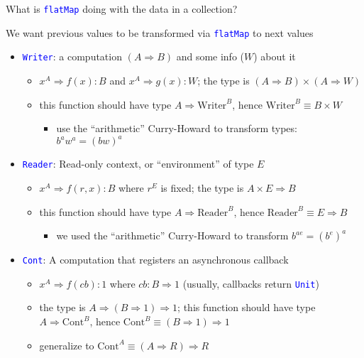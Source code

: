 \documentclass[english]{beamer}
\newenvironment{lyxcode}
   {\par\begin{list}{}{
     \setlength{\rightmargin}{\leftmargin}
     \setlength{\listparindent}{0pt}%
     \raggedright
     \setlength{\itemsep}{0pt}
     \setlength{\parsep}{0pt}
     \normalfont\ttfamily}%
    \def\{{\char`\{}
    \def\}{\char`\}}
    \def\textasciitilde{\char`\~}
    \item[]}
   {\end{list}}
\begin{document}
\begin{frame}{What is \texttt{\textcolor{blue}{\footnotesize{}flatMap}} doing with
the data in a collection?}
\begin{minipage}[t]{0.49\columnwidth}
\begin{lyxcode}
{We want previous values to be transformed via \texttt{\textcolor{blue}{\footnotesize{}flatMap}}
to next values
\begin{itemize}
\item \texttt{\textcolor{blue}{\footnotesize{}Writer}}: a computation $\left(A\Rightarrow B\right)$
and some info ($W$) about it
\begin{itemize}
\item $x^{A}\Rightarrow f(x):B$ and $x^{A}\Rightarrow g(x):W$; the type
is $\left(A\Rightarrow B\right)\times\left(A\Rightarrow W\right)$
\item this function should have type $A\Rightarrow\text{Writer}^{B}$, hence
$\text{Writer}^{B}\equiv B\times W$ 
\begin{itemize}
\item use the ``arithmetic'' Curry-Howard to transform types: $b^{a}w^{a}=(bw)^{a}$
\end{itemize}
\end{itemize}
\item \texttt{\textcolor{blue}{\footnotesize{}Reader}}: Read-only context,
or ``environment'' of type $E$
\begin{itemize}
\item $x^{A}\Rightarrow f(r,x):B$ where $r^{E}$ is fixed; the type is
$A\times E\Rightarrow B$
\item this function should have type $A\Rightarrow\text{Reader}^{B}$, hence
$\text{Reader}^{B}\equiv E\Rightarrow B$
\begin{itemize}
\item we used the ``arithmetic'' Curry-Howard to transform $b^{ae}=(b^{e})^{a}$
\end{itemize}
\end{itemize}
\item \texttt{\textcolor{blue}{\footnotesize{}Cont}}: A computation that
registers an asynchronous callback
\begin{itemize}
\item $x^{A}\Rightarrow f(cb):1$ where $cb:B\Rightarrow1$ (usually, callbacks
return \texttt{\textcolor{blue}{\footnotesize{}Unit}})
\item the type is{\footnotesize{} $A\Rightarrow\left(B\Rightarrow1\right)\Rightarrow1$};
this function should have type {\footnotesize{}$A\Rightarrow\text{Cont}^{B}$},
hence{\footnotesize{} $\text{Cont}^{B}\equiv\left(B\Rightarrow1\right)\Rightarrow1$}{\footnotesize \par}
\item generalize to {\footnotesize{}$\text{Cont}^{A}\equiv\left(A\Rightarrow R\right)\Rightarrow R$
}
\end{itemize}
\end{itemize}}
\end{lyxcode}
\end{minipage}
\end{frame}
\end{document}
